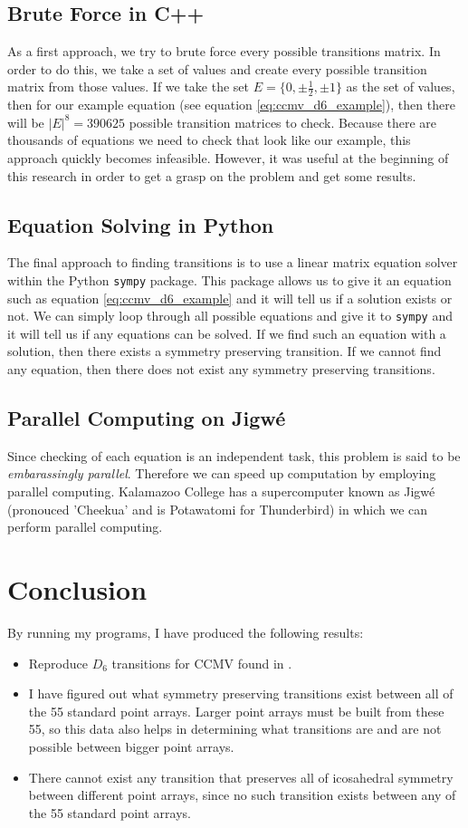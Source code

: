 \documentclass[a4paper,10pt]{article}
\theoremstyle{plain}
\theoremstyle{definition}
\theoremstyle{remark}
\newcommand\abs[1]{\left|#1\right|}
\begin{document}
\subsection{Brute Force in C++}
As a first approach, we try to brute force every possible transitions matrix.
In order to do this, we take a set of values and create every possible transition matrix from those values.
If we take the set \(E = \{0, \pm\frac{1}{2}, \pm 1\}\) as the set of values, then for our example equation (see equation \ref{eq:ccmv_d6_example}), then there will be \(\abs{E}^8 = 390625\) possible transition matrices to check.
Because there are thousands of equations we need to check that look like our example, this approach quickly becomes infeasible.
However, it was useful at the beginning of this research in order to get a grasp on the problem and get some results.

\subsection{Equation Solving in Python}
The final approach to finding transitions is to use a linear matrix equation solver within the Python \texttt{sympy} package.
This package allows us to give it an equation such as equation \ref{eq:ccmv_d6_example} and it will tell us if a solution exists or not.
We can simply loop through all possible equations and give it to \texttt{sympy} and it will tell us if any equations can be solved.
If we find such an equation with a solution, then there exists a symmetry preserving transition.
If we cannot find any equation, then there does not exist any symmetry preserving transitions.

\subsection{Parallel Computing on Jigwé}
Since checking of each equation is an independent task, this problem is said to be \emph{embarassingly parallel}.
Therefore we can speed up computation by employing parallel computing.
Kalamazoo College has a supercomputer known as Jigwé (pronouced 'Cheekua' and is Potawatomi for Thunderbird) in which we can perform parallel computing.

\section{Conclusion}
By running my programs, I have produced the following results:
\begin{itemize}
    \item Reproduce \(D_6\) transitions for CCMV found in \cite{indelicatoetal2012}.
    \item I have figured out what symmetry preserving transitions exist between all of the 55 standard point arrays. Larger point arrays must be built from these 55, so this data also helps in determining what transitions are and are not possible between bigger point arrays.
    \item There cannot exist any transition that preserves all of icosahedral symmetry between different point arrays, since no such transition exists between any of the 55 standard point arrays.
\end{itemize}
\end{document}
